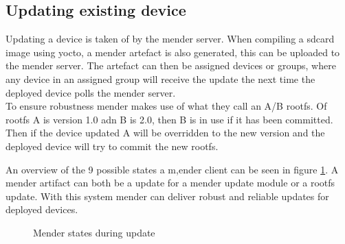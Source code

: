 \documentclass[../../main.tex]{subfiles}
\begin{document}
\subsection{Updating existing device}%
\label{sub:updating_existing_device}

Updating a device is taken of by the mender server. When compiling a sdcard image using yocto,
a mender artefact is also generated, this can be uploaded to the mender server.
The artefact can then be assigned devices or groups, where any device in an assigned group will
receive the update the next time the deployed device polls the mender server.\\

To ensure robustness mender makes use of what they call an A/B rootfs.
Of rootfs A is version 1.0 adn B is 2.0, then B is in use if it has been committed.
Then if the device updated A will be overridden to the new version and the deployed device will
try to commit the new rootfs.

An overview of the 9 possible states a m,ender client can be seen in figure \ref{fig:mender-states}.
A mender artifact can both be a update for a mender update module or a rootfs update.
With this system mender can deliver robust and reliable updates for deployed devices.

\begin{figure}[h]
\begin{center}
\end{center}
\caption{Mender states during update}%
\label{fig:mender-states}
\end{figure}
\end{document}
